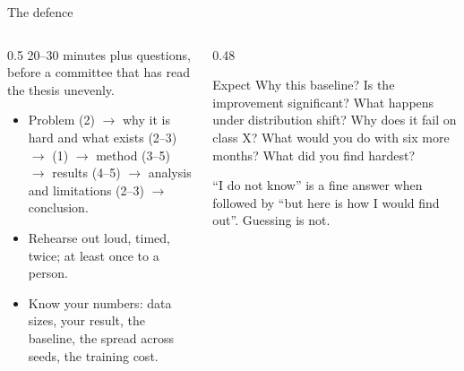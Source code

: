\documentclass[aspectratio=169,11pt]{beamer}
\begin{document}
\begin{frame}{The defence}
\begin{columns}[T]
\begin{column}{0.5\textwidth}
\footnotesize
20--30 minutes plus questions, before a committee that has read the thesis
unevenly.
\medskip
\begin{itemize}
  \item Problem (2) $\rightarrow$ why it is hard and what exists (2--3)
        $\rightarrow$  (1) $\rightarrow$ method (3--5)
        $\rightarrow$ results (4--5) $\rightarrow$ analysis and limitations
        (2--3) $\rightarrow$ conclusion.
  \item Rehearse out loud, timed, twice; at least once to a person.
  \item Know your numbers: data sizes, your result, the baseline, the spread
        across seeds, the training cost.
\end{itemize}
\end{column}
\begin{column}{0.48\textwidth}
\begin{block}{Expect}
\footnotesize
Why this baseline? Is the improvement significant? What happens under
distribution shift? Why does it fail on class X? What would you do with six
more months? What did you find hardest?
\end{block}
\begin{alertblock}{}
\footnotesize
``I do not know'' is a fine answer when followed by ``but here is how I would
find out''. Guessing is not.
\end{alertblock}
\end{column}
\end{columns}
\end{frame}
\end{document}
